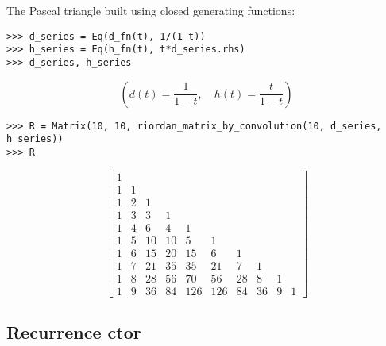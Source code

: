 \begin{example}
The Pascal triangle built using closed generating functions:
\begin{verbatim}
>>> d_series = Eq(d_fn(t), 1/(1-t))
>>> h_series = Eq(h_fn(t), t*d_series.rhs)
>>> d_series, h_series
\end{verbatim}
\begin{displaymath}
\left ( d{\left (t \right )} = \frac{1}{1-t}, \quad h{\left (t \right )} = \frac{t}{1-t}\right )
\end{displaymath}
\begin{verbatim}
>>> R = Matrix(10, 10, riordan_matrix_by_convolution(10, d_series, h_series))
>>> R
\end{verbatim}
\begin{displaymath}
\left[\begin{matrix}1 &   &   &   &   &   &   &   &   &  \\1 & 1 &   &   &   &   &   &   &   &  \\1 & 2 & 1 &   &   &   &   &   &   &  \\1 & 3 & 3 & 1 &   &   &   &   &   &  \\1 & 4 & 6 & 4 & 1 &   &   &   &   &  \\1 & 5 & 10 & 10 & 5 & 1 &   &   &   &  \\1 & 6 & 15 & 20 & 15 & 6 & 1 &   &   &  \\1 & 7 & 21 & 35 & 35 & 21 & 7 & 1 &   &  \\1 & 8 & 28 & 56 & 70 & 56 & 28 & 8 & 1 &  \\1 & 9 & 36 & 84 & 126 & 126 & 84 & 36 & 9 & 1\end{matrix}\right]
\end{displaymath}
\end{example}

\subsection{Recurrence ctor}


